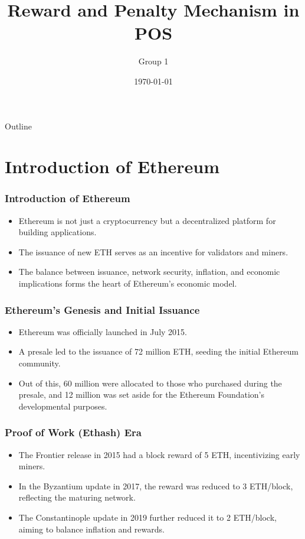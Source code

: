 \documentclass{beamer}
\title{Reward and Penalty Mechanism in POS}
\subtitle{}
\author{Group 1}
\date{\today}
\begin{document}
\maketitle
\begin{frame}{Outline}
  \tableofcontents
\end{frame}
\section{Introduction of Ethereum}%

\begin{frame}
\frametitle{Introduction of Ethereum}
\begin{itemize}
    \item Ethereum is not just a cryptocurrency but a decentralized platform for building applications.
    \item The issuance of new ETH serves as an incentive for validators and miners.
    \item The balance between issuance, network security, inflation, and economic implications forms the heart of Ethereum's economic model.
\end{itemize}
\end{frame}


\begin{frame}
\frametitle{Ethereum's Genesis and Initial Issuance}
\begin{itemize}
    \item Ethereum was officially launched in July 2015.
    \item A presale led to the issuance of 72 million ETH, seeding the initial Ethereum community.
    \item Out of this, 60 million were allocated to those who purchased during the presale, and 12 million was set aside for the Ethereum Foundation's developmental purposes.
\end{itemize}
\end{frame}


\begin{frame}
\frametitle{Proof of Work (Ethash) Era}
\begin{itemize}
    \item The Frontier release in 2015 had a block reward of 5 ETH, incentivizing early miners.
    \item In the Byzantium update in 2017, the reward was reduced to 3 ETH/block, reflecting the maturing network.
    \item The Constantinople update in 2019 further reduced it to 2 ETH/block, aiming to balance inflation and rewards.
\end{itemize}
\end{frame}
\end{document}

